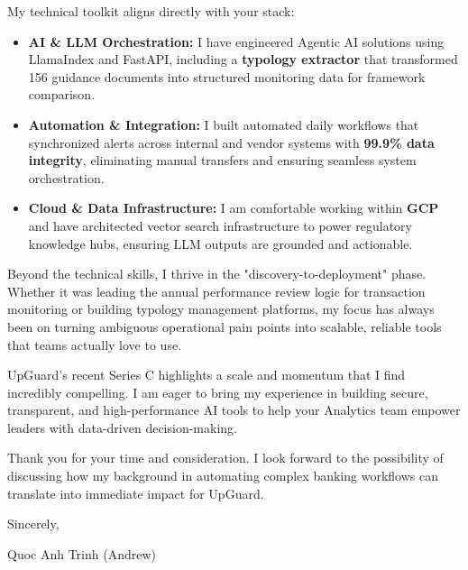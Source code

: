 \documentclass[11pt, a4paper]{article}
\begin{document}
My technical toolkit aligns directly with your stack:
\begin{itemize}
    \item \textbf{AI \& LLM Orchestration:} I have engineered Agentic AI solutions using LlamaIndex and FastAPI, including a \textbf{typology extractor} that transformed 156 guidance documents into structured monitoring data for framework comparison.
    \item \textbf{Automation \& Integration:} I built automated daily workflows that synchronized alerts across internal and vendor systems with \textbf{99.9\% data integrity}, eliminating manual transfers and ensuring seamless system orchestration.
    \item \textbf{Cloud \& Data Infrastructure:} I am comfortable working within \textbf{GCP} and have architected vector search infrastructure to power regulatory knowledge hubs, ensuring LLM outputs are grounded and actionable.
\end{itemize}

Beyond the technical skills, I thrive in the "discovery-to-deployment" phase. Whether it was leading the annual performance review logic for transaction monitoring or building typology management platforms, my focus has always been on turning ambiguous operational pain points into scalable, reliable tools that teams actually love to use.

UpGuard’s recent Series C highlights a scale and momentum that I find incredibly compelling. I am eager to bring my experience in building secure, transparent, and high-performance AI tools to help your Analytics team empower leaders with data-driven decision-making.

Thank you for your time and consideration. I look forward to the possibility of discussing how my background in automating complex banking workflows can translate into immediate impact for UpGuard.

\vspace{2em}

Sincerely,

\vspace{1em}

Quoc Anh Trinh (Andrew)
\end{document}
